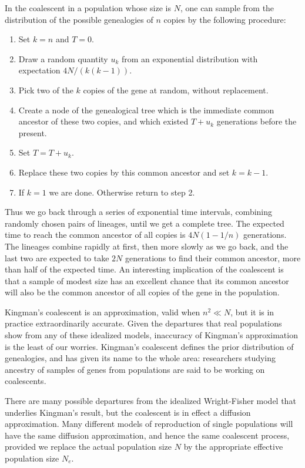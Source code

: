 In the coalescent in a population whose size is $N$, one can
sample from the distribution of the possible genealogies of $n$ copies by
the following procedure:
\begin{enumerate}
\item Set $k = n$ and $T = 0$.
\item Draw a random quantity $u_k$ from an exponential distribution with
expectation $4N/(k(k-1))$.
\item Pick two of the $k$ copies of the gene at random, without replacement.
\item Create a node of the genealogical tree which is the immediate common
ancestor of these two copies, and which existed $T + u_k$ generations
before the present.
\item Set $T = T + u_k$.
\item Replace these two copies by this common ancestor and set $k = k - 1$.
\item If $k = 1$ we are done.  Otherwise return to step 2.
\end{enumerate}

Thus we go back through a series of exponential time intervals, combining
randomly chosen pairs of lineages, until we get a complete tree.  The
expected time to reach the common ancestor of all copies is $4N(1-1/n)$
generations.  The lineages combine rapidly at first, then more slowly as we
go back, and the last two are expected to take $2N$ generations to find their
common ancestor, more than half of the expected time.  An interesting
implication of
the coalescent is that a sample of modest size has an excellent chance that
its common ancestor will also be the common ancestor of all copies of the
gene in the population.

Kingman's coalescent is an approximation, valid when $n^2 \ll N$, but it is
in practice extraordinarily accurate.  Given the departures that real
populations show from any of these idealized models, inaccuracy of
Kingman's approximation is the least of our worries.  Kingman's coalescent
defines the prior distribution of genealogies, and has given its name to the
whole area: researchers studying ancestry of samples of genes from populations
are said to be working on coalescents.

There are many possible departures from the idealized Wright-Fisher model
that underlies Kingman's result, but the coalescent is in effect a
diffusion approximation.  Many different models of reproduction of
single populations will have the same diffusion approximation, and hence
the same coalescent process, provided we replace the actual population size
$N$ by the appropriate effective population size $N_e$.

